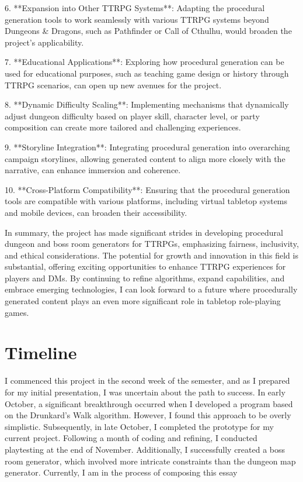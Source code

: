 \documentclass[10pt,twocolumn]{article}
\begin{document}
6. **Expansion into Other TTRPG Systems**: Adapting the procedural generation tools to work seamlessly with various TTRPG systems beyond Dungeons & Dragons, such as Pathfinder or Call of Cthulhu, would broaden the project's applicability.

7. **Educational Applications**: Exploring how procedural generation can be used for educational purposes, such as teaching game design or history through TTRPG scenarios, can open up new avenues for the project.

8. **Dynamic Difficulty Scaling**: Implementing mechanisms that dynamically adjust dungeon difficulty based on player skill, character level, or party composition can create more tailored and challenging experiences.

9. **Storyline Integration**: Integrating procedural generation into overarching campaign storylines, allowing generated content to align more closely with the narrative, can enhance immersion and coherence.

10. **Cross-Platform Compatibility**: Ensuring that the procedural generation tools are compatible with various platforms, including virtual tabletop systems and mobile devices, can broaden their accessibility.

In summary, the project has made significant strides in developing procedural dungeon and boss room generators for TTRPGs, emphasizing fairness, inclusivity, and ethical considerations. The potential for growth and innovation in this field is substantial, offering exciting opportunities to enhance TTRPG experiences for players and DMs. By continuing to refine algorithms, expand capabilities, and embrace emerging technologies, I can look forward to a future where procedurally generated content plays an even more significant role in tabletop role-playing games.


\section{Timeline}

I commenced this project in the second week of the semester, and as I prepared for my initial presentation, I was uncertain about the path to success. In early October, a significant breakthrough occurred when I developed a program based on the Drunkard's Walk algorithm. However, I found this approach to be overly simplistic. Subsequently, in late October, I completed the prototype for my current project. Following a month of coding and refining, I conducted playtesting at the end of November. Additionally, I successfully created a boss room generator, which involved more intricate constraints than the dungeon map generator. Currently, I am in the process of composing this essay
\end{document}
